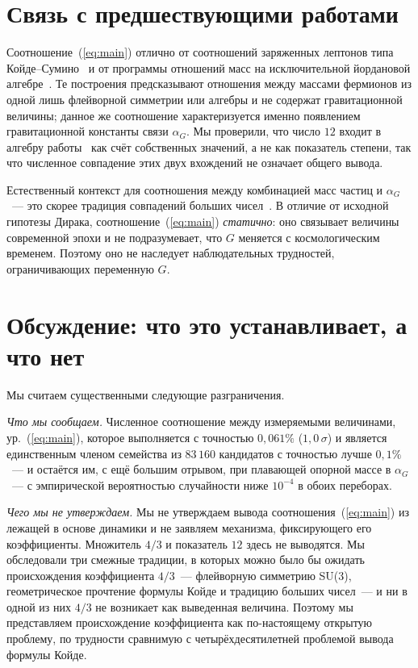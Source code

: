 \documentclass[aps,prd,twocolumn,amsmath,amssymb,floatfix,nofootinbib]{revtex4-2}
\begin{document}
\section{Связь с предшествующими работами}

Соотношение~(\ref{eq:main}) отлично от соотношений заряженных лептонов типа
Койде--Сумино~\cite{koide1983,sumino2009} и от программы отношений масс на
исключительной йордановой алгебре~\cite{singh2021}. Те построения
предсказывают отношения между массами фермионов из одной лишь флейворной
симметрии или алгебры и не содержат гравитационной величины; данное же
соотношение характеризуется именно появлением гравитационной константы связи
$\alpha_G$. Мы проверили, что число $12$ входит в алгебру
работы~\cite{singh2021} как счёт собственных значений, а не как показатель
степени, так что численное совпадение этих двух вхождений не означает общего
вывода.

Естественный контекст для соотношения между комбинацией масс частиц и
$\alpha_G$~--- это скорее традиция совпадений больших
чисел~\cite{dirac1938,wesson1980}. В отличие от исходной гипотезы Дирака,
соотношение~(\ref{eq:main}) \emph{статично}: оно связывает величины
современной эпохи и не подразумевает, что $G$ меняется с космологическим
временем. Поэтому оно не наследует наблюдательных трудностей, ограничивающих
переменную $G$.

\section{Обсуждение: что это устанавливает, а что нет}
\label{sec:discussion}

Мы считаем существенными следующие разграничения.

\emph{Что мы сообщаем.} Численное соотношение между измеряемыми величинами,
ур.~(\ref{eq:main}), которое выполняется с точностью $0{,}061\%$
($1{,}0\,\sigma$) и является единственным членом семейства из $83\,160$
кандидатов с точностью лучше $0{,}1\%$~--- и остаётся им, с ещё большим
отрывом, при плавающей опорной массе в $\alpha_G$~--- с эмпирической
вероятностью случайности ниже $10^{-4}$ в обоих переборах.

\emph{Чего мы не утверждаем.} Мы не утверждаем вывода
соотношения~(\ref{eq:main}) из лежащей в основе динамики и не заявляем
механизма, фиксирующего его коэффициенты. Множитель $4/3$ и показатель $12$
здесь не выводятся. Мы обследовали три смежные традиции, в которых можно было
бы ожидать происхождения коэффициента $4/3$~--- флейворную симметрию SU(3),
геометрическое прочтение формулы Койде и традицию больших чисел~--- и ни в
одной из них $4/3$ не возникает как выведенная величина. Поэтому мы
представляем происхождение коэффициента как по-настоящему открытую проблему,
по трудности сравнимую с четырёхдесятилетней проблемой вывода формулы Койде.
\end{document}
